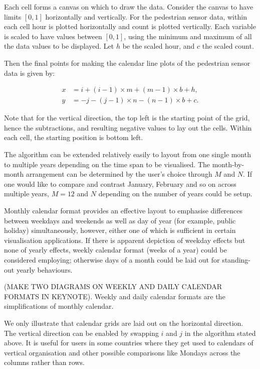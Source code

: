 \documentclass[article]{jss}
\begin{document}
Each cell forms a canvas on which to draw the data. Consider the canvas
to have limits \([0, 1]\) horizontally and vertically. For the
pedestrian sensor data, within each cell hour is plotted horizontally
and count is plotted vertically. Each variable is scaled to have values
between \([0,1]\), using the minimum and maximum of all the data values
to be displayed. Let \(h\) be the scaled hour, and \(c\) the scaled
count.

Then the final points for making the calendar line plots of the
pedestrian sensor data is given by:

\begin{equation}
  \begin{aligned}
  x &= i + (i - 1) \times m + (m - 1) \times b + h, \\
  y &= -j - (j - 1) \times n - (n - 1) \times b + c. \label{eq:final}
  \end{aligned}
\end{equation}

Note that for the vertical direction, the top left is the starting point
of the grid, hence the subtractions, and resulting negative values to
lay out the cells. Within each cell, the starting position is bottom
left.

The algorithm can be extended relatively easily to layout from one
single month to multiple years depending on the time span to be
visualised. The month-by-month arrangement can be determined by the
user's choice through \(M\) and \(N\). If one would like to compare and
contrast January, February and so on across multiple years, \(M = 12\)
and \(N\) depending on the number of years could be setup.

Monthly calendar format provides an effective layout to emphasise
differences between weekdays and weekends as well as day of year (for
example, public holiday) simultaneously, however, either one of which is
sufficient in certain visualisation applications. If there is apparent
depiction of weekday effects but none of yearly effects, weekly calendar
format (weeks of a year) could be considered employing; otherwise days
of a month could be laid out for standing-out yearly behaviours.

(MAKE TWO DIAGRAMS ON WEEKLY AND DAILY CALENDAR FORMATS IN KEYNOTE).
Weekly and daily calendar formats are the simplifications of monthly
calendar.

We only illustrate that calendar grids are laid out on the horizontal
direction. The vertical direction can be enabled by swapping \(i\) and
\(j\) in the algorithm stated above. It is useful for users in some
countries where they get used to calendars of vertical organisation and
other possible comparisons like Mondays across the columns rather than
rows.
\end{document}

